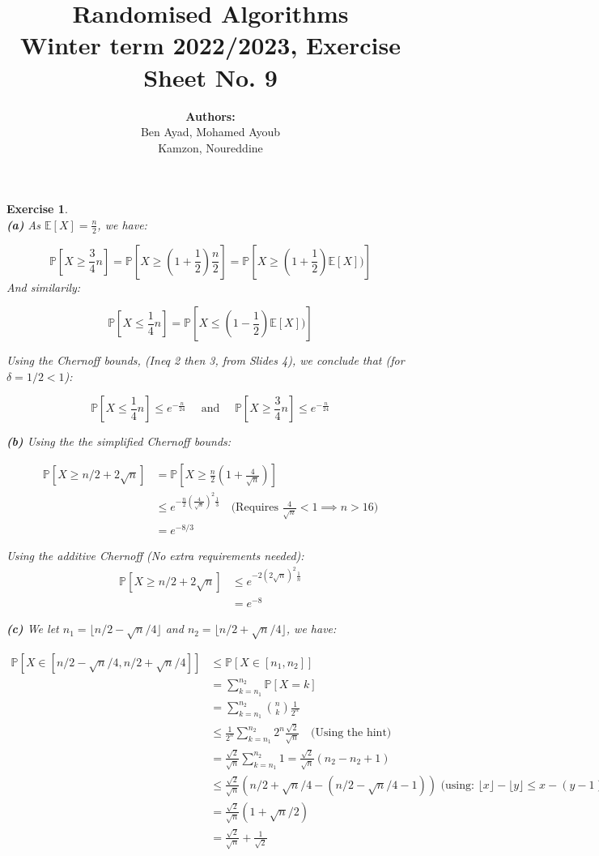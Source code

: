 \documentclass{article}
\title{Randomised Algorithms \\
Winter term 2022/2023, Exercise Sheet No. 9}
\author{
    \textbf{Authors:} \\
    Ben Ayad, Mohamed Ayoub \\
    Kamzon, Noureddine
}
\newcommand{\floor}[1]{\lfloor #1 \rfloor}
\newtheorem{exo}{Exercise}
\def\P{\mathbb{P}}
\def\E{\mathbb{E}}
\begin{document}
\maketitle

\begin{exo}{\ \\}
\noindent
\textbf{(a)} As $\E[X] = \frac{n}{2}$, we have:

\[\P[X \geq \frac{3}{4} n] 
    =  \P[X \geq (1 + \frac{1}{2}) \frac{n}{2}] 
    = \P[X \geq (1+\frac{1}{2}) \E[X])]\]
And similarily:

\[\P[X \leq \frac{1}{4} n] 
    = \P[X \leq (1-\frac{1}{2}) \E[X])]\]

Using the Chernoff bounds, (Ineq 2 then 3, from Slides 4), we conclude that (for $\delta = 1/2 <  1$):

\[
\P[X \leq \frac{1}{4} n] \leq e^{-\frac{n}{24}}
\quad \text{ and }  \quad
\P[X \geq \frac{3}{4} n] \leq  e^{-\frac{n}{24}}
\]

\noindent
\textbf{(b)} Using the the simplified Chernoff bounds:

\begin{align*}
\P[X \geq n/2 +2\sqrt{n}]   
&= \P[X \geq \frac{n}{2}(1 + \frac{4}{\sqrt{n}})] \\
&\leq e^{ - \frac{n}{2} \left( \frac{4}{\sqrt{n}} \right)^2 \frac{1}{3}} 
\quad \text{(Requires $\frac{4}{\sqrt{n}} < 1 \implies n > 16$)}
\\
&= e^{-8/3}
\end{align*}

Using the additive Chernoff (No extra requirements needed):
\begin{align*}
\P[X \geq n/2 +2\sqrt{n}]   
&\leq e^{-2 \left(2 \sqrt{n} \right)^2 \frac{1}{n}}\\
&= e^{-8}
\end{align*}

\noindent
\textbf{(c)} We let $n_1 = \floor{n/2 - \sqrt{n}/4}$ and $n_2 = \floor{n/2 + \sqrt{n}/4}$, we have:

\begin{align*}
    \P[X \in [n/2 - \sqrt{n}/4, n/2 + \sqrt{n}/4]]
    &\leq \P[X \in [n_1, n_2]] \\
    &= \sum^{n_2}_{k=n_1} \P[X = k] \\
    &= \sum^{n_2}_{k = n_1} \binom{n}{k} \frac{1}{2^n} \\
    &\leq \frac{1}{2^n} \sum^{n_2}_{k = n_1} 2^n \frac{\sqrt{2}}{\sqrt{n}}  
    \quad \text{(Using the hint)}
    \\
    &= \frac{\sqrt{2}}{\sqrt{n}} \sum^{n_2}_{k=n_1} 1  
    = \frac{\sqrt{2}}{\sqrt{n}} (n_2 - n_2 +1) \\
    &\leq \frac{\sqrt{2}}{\sqrt{n}}  
    \left(n/2 + \sqrt{n}/4 - (n/2 - \sqrt{n}/4 - 1)\right) 
    \text{ (using: $\floor{x}-\floor{y} \leq x-(y-1)$)}
    \\
    &= \frac{\sqrt{2}}{\sqrt{n}} (1 + \sqrt{n}/2)\\
    &= \frac{\sqrt{2}}{\sqrt{n}}  + \frac{1}{\sqrt{2}} 
\end{align*}


\end{exo}
\end{document}
